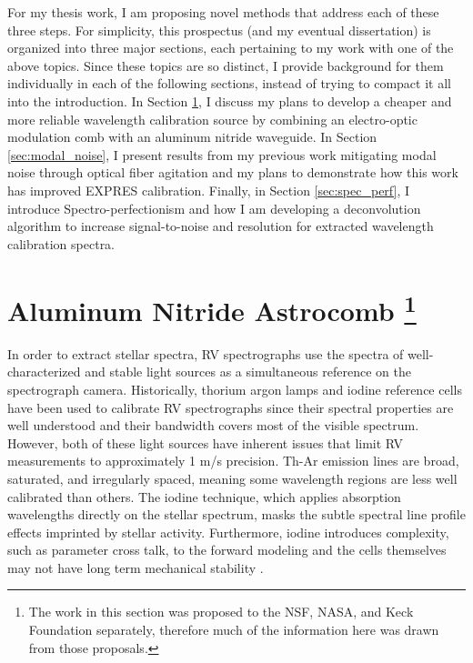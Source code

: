 \documentclass[11pt]{article}
\begin{document}
For my thesis work, I am proposing novel methods that address each of these three steps. For simplicity, this prospectus (and my eventual dissertation) is organized into three major sections, each pertaining to my work with one of the above topics. Since these topics are so distinct, I provide background for them individually in each of the following sections, instead of trying to compact it all into the introduction. In Section \ref{sec:astrocomb}, I discuss my plans to develop a cheaper and more reliable wavelength calibration source by combining an electro-optic modulation comb with an aluminum nitride waveguide. In Section \ref{sec:modal_noise}, I present results from my previous work mitigating modal noise through optical fiber agitation and my plans to demonstrate how this work has improved EXPRES calibration. Finally, in Section \ref{sec:spec_perf}, I introduce Spectro-perfectionism and how I am developing a deconvolution algorithm to increase signal-to-noise and resolution for extracted wavelength calibration spectra.

\section{Aluminum Nitride Astrocomb \footnote{The work in this section was proposed to the NSF, NASA, and Keck Foundation separately, therefore much of the information here was drawn from those proposals.}}
\label{sec:astrocomb}

In order to extract stellar spectra, RV spectrographs use the spectra of well-characterized and stable light sources as a simultaneous reference on the spectrograph camera. Historically, thorium argon lamps and iodine reference cells have been used to calibrate RV spectrographs since their spectral properties are well understood and their bandwidth covers most of the visible spectrum. However, both of these light sources have inherent issues that limit RV measurements to approximately 1 m/s precision. Th-Ar emission lines are broad, saturated, and irregularly spaced, meaning some wavelength regions are less well calibrated than others. The iodine technique, which applies absorption wavelengths directly on the stellar spectrum, masks the subtle spectral line profile effects imprinted by stellar activity. Furthermore, iodine introduces complexity, such as parameter cross talk, to the forward modeling \cite{Spronck2015} and the cells themselves may not have long term mechanical stability \cite{Fischer2014a}.
\end{document}
